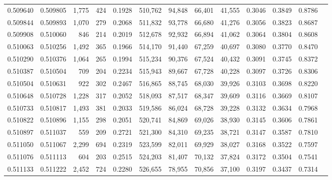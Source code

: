 \begin{tabular}{rrrrrrrrrrrrr}
0.509640 & 0.509805 & 1,775 &   424 &                                     0.1928 & 510,762 &  94,848 &  66,401 &  41,555 & 0.3046 & 0.3849 & 0.8786 \\
0.509844 & 0.509893 & 1,070 &   279 &                                     0.2068 & 511,832 &  93,778 &  66,680 &  41,276 & 0.3056 & 0.3823 & 0.8687 \\
0.509908 & 0.510060 &   846 &   214 &                                     0.2019 & 512,678 &  92,932 &  66,894 &  41,062 & 0.3064 & 0.3804 & 0.8608 \\
0.510063 & 0.510256 & 1,492 &   365 &                                     0.1966 & 514,170 &  91,440 &  67,259 &  40,697 & 0.3080 & 0.3770 & 0.8470 \\
0.510290 & 0.510376 & 1,064 &   265 &                                     0.1994 & 515,234 &  90,376 &  67,524 &  40,432 & 0.3091 & 0.3745 & 0.8372 \\
0.510387 & 0.510504 &   709 &   204 &                                     0.2234 & 515,943 &  89,667 &  67,728 &  40,228 & 0.3097 & 0.3726 & 0.8306 \\
0.510504 & 0.510631 &   922 &   302 &                                     0.2467 & 516,865 &  88,745 &  68,030 &  39,926 & 0.3103 & 0.3698 & 0.8220 \\
0.510648 & 0.510728 & 1,228 &   317 &                                     0.2052 & 518,093 &  87,517 &  68,347 &  39,609 & 0.3116 & 0.3669 & 0.8107 \\
0.510733 & 0.510817 & 1,493 &   381 &                                     0.2033 & 519,586 &  86,024 &  68,728 &  39,228 & 0.3132 & 0.3634 & 0.7968 \\
0.510822 & 0.510896 & 1,155 &   298 &                                     0.2051 & 520,741 &  84,869 &  69,026 &  38,930 & 0.3145 & 0.3606 & 0.7861 \\
0.510897 & 0.511037 &   559 &   209 &                                     0.2721 & 521,300 &  84,310 &  69,235 &  38,721 & 0.3147 & 0.3587 & 0.7810 \\
0.511050 & 0.511067 & 2,299 &   694 &                                     0.2319 & 523,599 &  82,011 &  69,929 &  38,027 & 0.3168 & 0.3522 & 0.7597 \\
0.511076 & 0.511113 &   604 &   203 &                                     0.2515 & 524,203 &  81,407 &  70,132 &  37,824 & 0.3172 & 0.3504 & 0.7541 \\
0.511133 & 0.511222 & 2,452 &   724 &                                     0.2280 & 526,655 &  78,955 &  70,856 &  37,100 & 0.3197 & 0.3437 & 0.7314 \\

\end{tabular}
